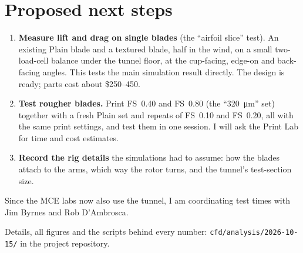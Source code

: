 \documentclass[11pt]{article}
\begin{document}
\section{Proposed next steps}\label{sec:next}
\begin{enumerate}
\item \textbf{Measure lift and drag on single blades} (the ``airfoil slice'' test). An existing Plain
  blade and a textured blade, half in the wind, on a small two-load-cell balance under the tunnel
  floor, at the cup-facing, edge-on and back-facing angles. This tests the main simulation result
  directly. The design is ready; parts cost about \$250--450.
\item \textbf{Test rougher blades.} Print FS~0.40 and FS~0.80 (the ``\SI{320}{\micro\metre}'' set)
  together with a fresh Plain set and repeats of FS~0.10 and FS~0.20, all with the same print
  settings, and test them in one session. I will ask the Print Lab for time and cost estimates.
\item \textbf{Record the rig details} the simulations had to assume: how the blades attach to the arms,
  which way the rotor turns, and the tunnel's test-section size.
\end{enumerate}
Since the MCE labs now also use the tunnel, I am coordinating test times with Jim Byrnes and Rob
D'Ambrosca.

\vspace{0.6em}
{\small\color{ink2}Details, all figures and the scripts behind every number:
\texttt{cfd/analysis/2026-10-15/} in the project repository.}
\end{document}
